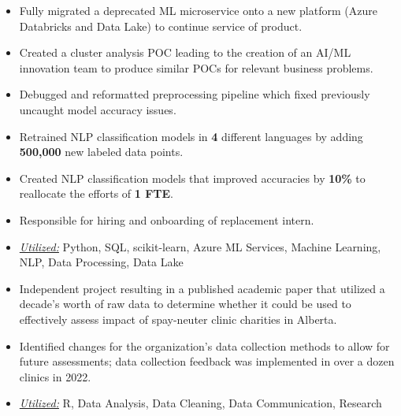 \documentclass[10pt,a4paper,ragged2e]{altacv}
\begin{document}
\begin{itemize}
\item Fully migrated a deprecated ML microservice onto a new platform (Azure Databricks and Data Lake) to continue service of product.
\item Created a cluster analysis POC leading to the creation of an AI/ML innovation team to produce similar POCs for relevant business problems.
\item Debugged and reformatted preprocessing pipeline which fixed previously uncaught model accuracy issues.
\item Retrained NLP classification models in \textbf{4} different languages by adding \textbf{500,000} new labeled data points. 
\item Created NLP classification models that improved accuracies by \textbf{10\%} to reallocate the efforts of \textbf{1 FTE}.
\item Responsible for hiring and onboarding of replacement intern.
\item \underline{\textit{Utilized:}} Python, SQL, scikit-learn, Azure ML Services, Machine Learning, NLP, Data Processing, Data Lake
\end{itemize}
\divider

\begin{itemize}
\item Independent project resulting in a published academic paper that utilized a decade's worth of raw data to determine whether it could be used to effectively assess impact of spay-neuter clinic charities in Alberta.
\item Identified changes for the organization's data collection methods to allow for future assessments; data collection feedback was implemented in over a dozen clinics in 2022.
\item \underline{\textit{Utilized:}} R, Data Analysis, Data Cleaning, Data Communication, Research
\end{itemize}



\clearpage
\nocite{*}
\end{document}

